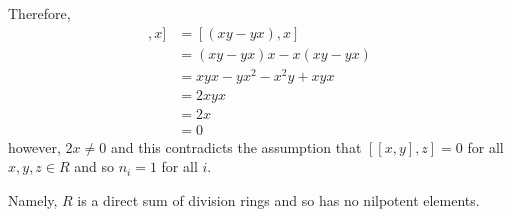 \documentclass[12pt]{AlgebraQual}
\begin{document}
\begin{solution}
Therefore, \begin{align*}
    [[x,y],x]&=[(xy-yx),x]\\
    &=(xy-yx)x-x(xy-yx)\\
    &=xyx-yx^2-x^2y+xyx\\
    &=2xyx\\
    &=2x\\
    &=0
\end{align*} however, $2x\not=0$ and this contradicts the assumption that $[[x,y],z]=0$ for all $x,y,z\in R$ and so $n_i=1$ for all $i.$

Namely, $R$ is a direct sum of division rings and so has no nilpotent elements.
\end{solution}
\newpage
\end{document}

